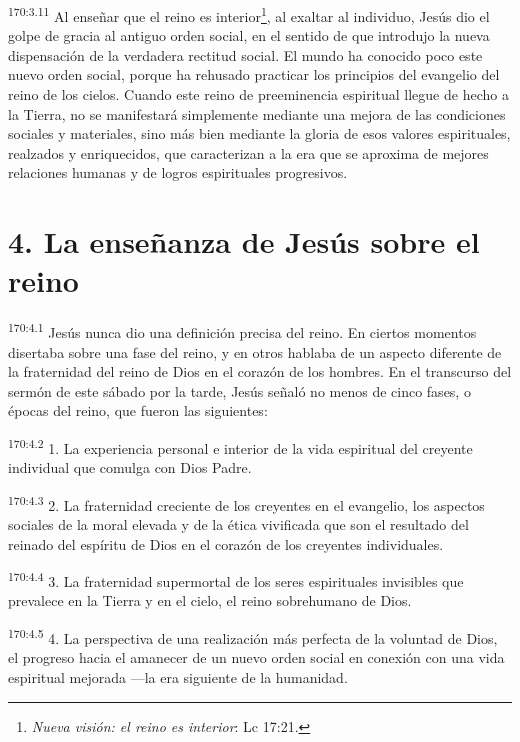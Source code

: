 \par
\textsuperscript{170:3.11} Al enseñar que el reino es interior\footnote{\textit{Nueva visión: el reino es interior}: Lc 17:21.}, al exaltar al individuo, Jesús dio el golpe de gracia al antiguo orden social, en el sentido de que introdujo la nueva dispensación de la verdadera rectitud social. El mundo ha conocido poco este nuevo orden social, porque ha rehusado practicar los principios del evangelio del reino de los cielos. Cuando este reino de preeminencia espiritual llegue de hecho a la Tierra, no se manifestará simplemente mediante una mejora de las condiciones sociales y materiales, sino más bien mediante la gloria de esos valores espirituales, realzados y enriquecidos, que caracterizan a la era que se aproxima de mejores relaciones humanas y de logros espirituales progresivos.

\section*{4. La enseñanza de Jesús sobre el reino}
\par
\textsuperscript{170:4.1} Jesús nunca dio una definición precisa del reino. En ciertos momentos disertaba sobre una fase del reino, y en otros hablaba de un aspecto diferente de la fraternidad del reino de Dios en el corazón de los hombres. En el transcurso del sermón de este sábado por la tarde, Jesús señaló no menos de cinco fases, o épocas del reino, que fueron las siguientes:

\par
\textsuperscript{170:4.2} 1. La experiencia personal e interior de la vida espiritual del creyente individual que comulga con Dios Padre.

\par
\textsuperscript{170:4.3} 2. La fraternidad creciente de los creyentes en el evangelio, los aspectos sociales de la moral elevada y de la ética vivificada que son el resultado del reinado del espíritu de Dios en el corazón de los creyentes individuales.

\par
\textsuperscript{170:4.4} 3. La fraternidad supermortal de los seres espirituales invisibles que prevalece en la Tierra y en el cielo, el reino sobrehumano de Dios.

\par
\textsuperscript{170:4.5} 4. La perspectiva de una realización más perfecta de la voluntad de Dios, el progreso hacia el amanecer de un nuevo orden social en conexión con una vida espiritual mejorada ---la era siguiente de la humanidad.

